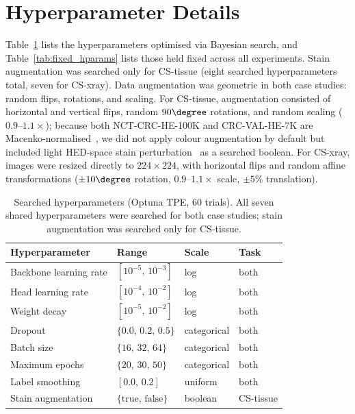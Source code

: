 \section{Hyperparameter Details}
\label{app:hparams}

Table~\ref{tab:searched_hparams} lists the hyperparameters optimised via Bayesian search, and Table~\ref{tab:fixed_hparams} lists those held fixed across all experiments. Stain augmentation was searched only for CS-tissue (eight searched hyperparameters total, seven for CS-xray). Data augmentation was geometric in both case studies: random flips, rotations, and scaling. For CS-tissue, augmentation consisted of horizontal and vertical flips, random $90\degree$ rotations, and random scaling ($0.9$--$1.1\times$); because both NCT-CRC-HE-100K and CRC-VAL-HE-7K are Macenko-normalised~\cite{macenko2009}, we did not apply colour augmentation by default but included light HED-space stain perturbation~\cite{tellez2019} as a searched boolean. For CS-xray, images were resized directly to $224 \times 224$, with horizontal flips and random affine transformations ($\pm 10\degree$ rotation, $0.9$--$1.1\times$ scale, $\pm 5\%$ translation).

\begin{table}[h]
\centering
\caption{Searched hyperparameters (Optuna TPE, 60 trials). All seven shared hyperparameters were searched for both case studies; stain augmentation was searched only for CS-tissue.}
\label{tab:searched_hparams}
\begin{tabular}{llll}
\toprule
Hyperparameter & Range & Scale & Task \\
\midrule
Backbone learning rate & $[10^{-5},\, 10^{-3}]$ & log & both \\
Head learning rate & $[10^{-4},\, 10^{-2}]$ & log & both \\
Weight decay & $[10^{-5},\, 10^{-2}]$ & log & both \\
Dropout & $\{0.0,\, 0.2,\, 0.5\}$ & categorical & both \\
Batch size & $\{16,\, 32,\, 64\}$ & categorical & both \\
Maximum epochs & $\{20,\, 30,\, 50\}$ & categorical & both \\
Label smoothing & $[0.0,\, 0.2]$ & uniform & both \\
Stain augmentation & $\{\text{true},\, \text{false}\}$ & boolean & CS-tissue \\
\bottomrule
\end{tabular}
\end{table}

